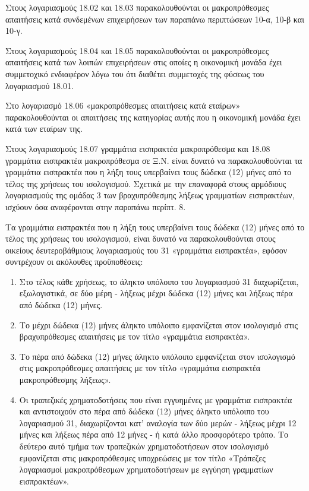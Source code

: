 \documentclass[A4,10pt,greek]{book}
\begin{document}
Στους λογαριασμούς 18.02 και 18.03 παρακολουθούνται οι μακροπρόθεσμες απαιτήσεις κατά συνδεμένων επιχειρήσεων των παραπάνω περιπτώσεων 10-α, 10-β και 10-γ.

Στους λογαριασμούς 18.04 και 18.05 παρακολουθούνται οι μακροπρόθεσμες απαιτήσεις κατά των λοιπών επιχειρήσεων στις οποίες η οικονομική μονάδα έχει συμμετοχικό ενδιαφέρον λόγω του ότι διαθέτει συμμετοχές της φύσεως του λογαριασμού 18.01.

Στο λογαριασμό 18.06 «μακροπρόθεσμες απαιτήσεις κατά εταίρων» παρακολουθούνται οι απαιτήσεις της κατηγορίας αυτής που η οικονομική μονάδα έχει κατά των εταίρων της.

Στους λογαριασμούς 18.07 γραμμάτια εισπρακτέα μακροπρόθεσμα και 18.08 γραμμάτια εισπρακτέα μακροπρόθεσμα σε Ξ.Ν. είναι δυνατό να παρακολουθούνται τα γραμμάτια εισπρακτέα που η λήξη τους υπερβαίνει τους δώδεκα (12) μήνες από το τέλος της χρήσεως του ισολογισμού. Σχετικά με την επαναφορά στους αρμόδιους λογαριασμούς της ομάδας 3 των βραχυπρόθεσμης λήξεως γραμματίων εισπρακτέων, ισχύουν όσα αναφέρονται στην παραπάνω περίπτ. 8.

Τα γραμμάτια εισπρακτέα που η λήξη τους υπερβαίνει τους δώδεκα (12) μήνες από το τέλος της χρήσεως του ισολογισμού, είναι δυνατό να παρακολουθούνται στους οικείους δευτεροβάθμιους λογαριασμούς του 31 «γραμμάτια εισπρακτέα», εφόσον συντρέχουν οι ακόλουθες προϋποθέσεις:

\begin{enumerate}

\item Στο τέλος κάθε χρήσεως, το άληκτο υπόλοιπο του λογαριασμού 31 διαχωρίζεται, εξωλογιστικά, σε δύο μέρη - λήξεως μέχρι δώδεκα (12) μήνες και λήξεως πέρα από δώδεκα (12) μήνες.

\item Το μέχρι δώδεκα (12) μήνες άληκτο υπόλοιπο εμφανίζεται στον ισολογισμό στις βραχυπρόθεσμες απαιτήσεις με τον τίτλο «γραμμάτια εισπρακτέα».

\item Το πέρα από δώδεκα (12) μήνες άληκτο υπόλοιπο εμφανίζεται στον ισολογισμό στις μακροπρόθεσμες απαιτήσεις με τον τίτλο «γραμμάτια εισπρακτέα μακροπρόθεσμης λήξεως».

\item Οι τραπεζικές χρηματοδοτήσεις που είναι εγγυημένες με γραμμάτια εισπρακτέα και αντιστοιχούν στο πέρα από δώδεκα (12) μήνες άληκτο υπόλοιπο του λογαριασμού 31, διαχωρίζονται κατ' αναλογία των δύο μερών - λήξεως μέχρι 12 μήνες και λήξεως πέρα από 12 μήνες - ή κατά άλλο προσφορότερο τρόπο. Το δεύτερο αυτό τμήμα των τραπεζικών χρηματοδοτήσεων στον ισολογισμό εμφανίζεται στις μακροπρόθεσμες υποχρεώσεις με τον τίτλο «Τράπεζες λογαριασμοί μακροπρόθεσμων χρηματοδοτήσεων με εγγύηση γραμματίων εισπρακτέων».

\end{enumerate}
\end{document}
